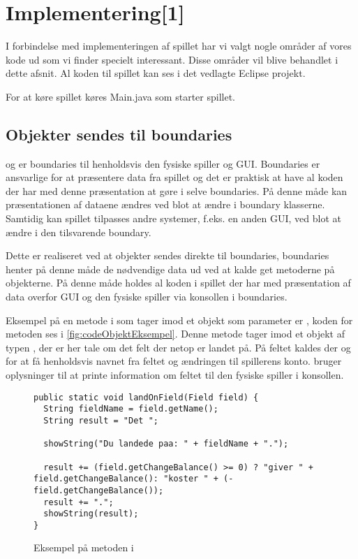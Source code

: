 \chapter{Implementering[1]}\label{chap:implementering}
I forbindelse med implementeringen af spillet har vi valgt nogle områder af vores kode ud som vi finder specielt interessant. Disse områder vil blive behandlet i dette afsnit. Al koden til spillet kan ses i det vedlagte Eclipse projekt.

For at køre spillet køres Main.java som starter spillet.

\section{Objekter sendes til boundaries} \label{sec:implementering:objektToBoundary}
 og  er boundaries til henholdsvis den fysiske spiller og GUI. Boundaries er ansvarlige for at præsentere data fra spillet og det er praktisk at have al koden der har med denne præsentation at gøre i selve boundaries. På denne måde kan præsentationen af dataene ændres ved blot at ændre i boundary klasserne. Samtidig kan spillet tilpasses andre systemer, f.eks. en anden GUI, ved blot at ændre i den tilsvarende boundary.

Dette er realiseret ved at objekter sendes direkte til boundaries, boundaries henter på denne måde de nødvendige data ud ved at kalde get metoderne på objekterne. På denne måde holdes al koden i spillet der har med præsentation af data overfor GUI og den fysiske spiller via konsollen i boundaries.

Eksempel på en metode i  som tager imod et objekt som parameter er , koden for metoden ses i \vref{fig:codeObjektEksempel}. Denne metode tager imod et objekt af typen , der er her tale om det felt der netop er landet på. På feltet kaldes der  og  for at få henholdsvis navnet fra feltet og ændringen til spillerens konto.  bruger oplysninger til at printe information om feltet til den fysiske spiller i konsollen.

\begin{figure}
\caption{Eksempel på metoden  i }
\label{fig:codeObjektEksempel}
\begin{lstlisting}
public static void landOnField(Field field) {
  String fieldName = field.getName();
  String result = "Det ";

  showString("Du landede paa: " + fieldName + ".");
  
  result += (field.getChangeBalance() >= 0) ? "giver " + field.getChangeBalance(): "koster " + (-field.getChangeBalance());
  result += ".";
  showString(result);
}
\end{lstlisting}
\end{figure}

